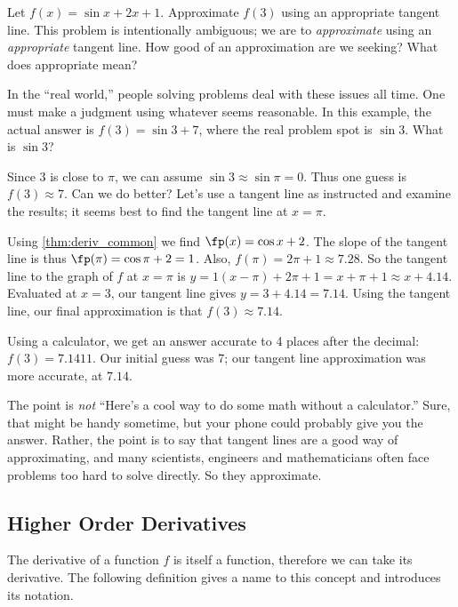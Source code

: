 \begin{example}\label{ex_der2}
Let $f(x) = \sin x + 2x+1$. Approximate $f(3)$ using an appropriate tangent line.
\solution
This problem is intentionally ambiguous; we are to \emph{approximate} using an \emph{appropriate} tangent line. How good of an approximation are we seeking? What does appropriate mean?

In the ``real world,'' people solving problems deal with these issues all time. One must make a judgment using whatever seems reasonable. In this example, the actual answer is $f(3) = \sin 3 + 7$, where the real problem spot is $\sin 3$. What is $\sin 3$?

Since $3$ is close to $\pi$, we can assume $\sin 3\approx \sin \pi = 0$. Thus one guess is $f(3) \approx 7$. Can we do better? Let's use a tangent line as instructed and examine the results; it seems best to find the tangent line at $x=\pi$. 

Using \autoref{thm:deriv_common} we find $\fp(x) = \cos x + 2$. The slope of the tangent line is thus $\fp(\pi) = \cos \pi + 2 =1$. Also, $f(\pi) = 2\pi+1 \approx 7.28$. So the tangent line to the graph of $f$ at $x=\pi$ is $y=1(x-\pi)+ 2\pi+1 =x+\pi+1 \approx x+4.14$. Evaluated at $x=3$, our tangent line gives $y=3+4.14 = 7.14$. Using the tangent line, our final approximation is that $f(3) \approx 7.14$.

Using a calculator, we get an answer accurate to 4 places after the decimal: $f(3) = 7.1411$. Our initial guess was $7$; our tangent line approximation was more accurate, at $7.14$.

The point is \emph{not} ``Here's a cool way to do some math without a calculator.'' Sure, that might be handy sometime, but your phone could probably give you the answer. Rather, the point is to say that tangent lines are a good way of approximating, and many scientists, engineers and mathematicians often face problems too hard to solve directly. So they approximate.
\end{example}

\subsection{Higher Order Derivatives}

The derivative of a function $f$ is itself a function, therefore we can take its derivative. The following definition gives a name to this concept and introduces its notation.

